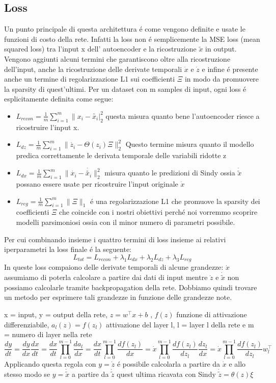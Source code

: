 \documentclass[11pt]{article}
\begin{document}
\subsection{Loss }
Un punto principale di questa architettura é come vengono definite e usate le funzioni di costo della rete. Infatti la loss non é semplicemente la MSE loss (mean squared loss) tra l'input x dell' autoencoder e la ricostruzione $\tilde{x}$ in output. Vengono aggiunti alcuni termini che garantiscono oltre alla ricostruzione dell'input, anche la ricostruzione delle derivate temporali $\dot{x}$ e $\dot{z}$ e infine é presente anche un termine di regolarizzazione L1 sui coefficienti $\Xi $ in modo da promuovere la sparsity di quest'ultimi.
\newline
Per un dataset con m samples di input, ogni loss é esplicitamente definita come segue:

\begin{itemize}
\item $L_{recon} = \frac{1}{m}\sum_{i=1}^{m}\|x_i - \tilde{x_i}|_2^2 $ questa misura quanto bene l'autoencoder riesce a ricostruire l'input x.
\item $L_{dz} = \frac{1}{m}\sum_{i=1}^{m}\|\dot{z_i} - \Theta(z_i)\Xi\|_2^2 $ Questo termine misura quanto il modello predica correttamente le derivata temporale delle variabili ridotte z
\item $L_{dx} = \frac{1}{m}\sum_{i=1}^{m}\|\dot{x_i} - \dot{\tilde{x_i}}\|_2^2 $ misura quanto le predizioni di Sindy ossia $\dot{\tilde{x}}$ possano essere usate per ricostruire l'input originale $\dot{x}$
\item $L_{reg} = \frac{1}{m}\sum_{i=1}^{m}\|{\Xi}\|_1 $ é una regolarizzazione L1 che promuove la sparsity dei coefficienti $\Xi$ che coincide con i nostri obiettivi perché noi vorremmo scoprire modelli parsimoniosi ossia con il minor numero di parametri possibile.
\end{itemize}
Per cui combinando insieme i quattro termini di loss insieme ai relativi iperparametri la loss finale é la seguente: 
$$L_{tot} = L_{recon} + \lambda_1L_{dx} + \lambda_2L_{dz} + \lambda_3L_{reg} $$
In queste loss compaiono delle derivate temporali di alcune grandezze: $\dot{x}$ assumiamo di poterla calcolare a partire dai dati di input mentre $\dot{z}$ e $\dot{\tilde{x}}$ non possiamo calcolarle tramite backpropagation della rete.
Dobbiamo quindi trovare un metodo per esprimere tali grandezze in funzione delle grandezze note.

x = input, y = output della rete, $z = w^{\top}x + b$ , $f(z) $ funzione di attivazione differenziabile, $a_{l}(z) = f(z_l)$ attivazione del layer l, l = layer l  della rete e m = numero di layer nella rete
$$ 
\frac{dy}{dt} =
\frac{dy}{dx}\frac{dx}{dt} =
\frac{dx}{dt}\prod_{l=0}^{m-1} \frac{da_l}{dx} =
\frac{dx}{dt}\prod_{l=0}^{m-1} \frac{df(z_l)}{dx} =
\dot{x}\prod_{l=0}^{m-1} \frac{df(z_l)}{dz_l}\frac{dz_l}{dx} = 
\dot{x}\prod_{l=0}^{m-1} \frac{df(z_l)}{dz_l}w_l^{\top} 
$$
Applicando questa regola con $y = \dot{z} $ é possibile calcolarla a partire da $\dot{x}$ e allo stesso modo se $y = \dot{\tilde{x}}$ a partire da $\dot{\tilde{z}}$ quest ultima ricavata con Sindy $\dot{\tilde{z}} = \theta(z)\xi$
\end{document}
